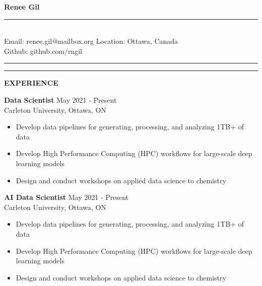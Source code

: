 \documentclass[11pt]{article}
\begin{document}
\pagestyle{empty}

\textbf{\Huge Renee Gil} \\[2pt]
\noindent\rule{\textwidth}{0.05pt}\\[-1pt]
{\color{accentgray}\small Email: renee.gil@mailbox.org \hfill Location: Ottawa, Canada \\
Github: github.com/rngil}\\[-6pt]
\noindent\rule{\textwidth}{0.1pt}

\noindent\textcolor{accentblue}{\rule{3pt}{12pt}} {\color{headinggray}\textbf{\large EXPERIENCE}}
\vspace*{0.1in}

\textbf{Data Scientist} \hfill {\color{accentgray} May 2021 - Present}\\
{\color{accentgray} Carleton University, Ottawa, ON}\\[4pt]
\begin{itemize}[itemsep=0.1pt, topsep=0pt]
    \item Develop data pipelines for generating, processing, and analyzing 1TB+ of data
    \item Develop High Performance Computing (HPC) workflows for large-scale deep learning models
    \item Design and conduct workshops on applied data science to chemistry
\end{itemize}
\vspace*{0.15in}

\textbf{AI Data Scientist} \hfill {\color{accentgray} May 2021 - Present}\\
{\color{accentgray} Carleton University, Ottawa, ON}\\[4pt]
\begin{itemize}[itemsep=0.1pt, topsep=0pt]
    \item Develop data pipelines for generating, processing, and analyzing 1TB+ of data
    \item Develop High Performance Computing (HPC) workflows for large-scale deep learning models
    \item Design and conduct workshops on applied data science to chemistry
\end{itemize}
\vspace*{0.15in}
\end{document}

